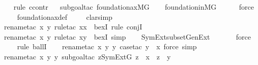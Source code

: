 \begin{isabellebody}
%
\isadelimproof
\ \ %
\endisadelimproof
%
\isatagproof
{}\isamarkupfalse%
{\isacharparenleft}{\kern0pt}rule\ ccontr{\isacharparenright}{\kern0pt}\isanewline
\ \ \isamarkupfalse%
{\isacharparenleft}{\kern0pt}subgoal{\isacharunderscore}{\kern0pt}tac\ {\isachardoublequoteopen}{\isasymnot}foundation{\isacharunderscore}{\kern0pt}ax{\isacharparenleft}{\kern0pt}{\isacharhash}{\kern0pt}{\isacharhash}{\kern0pt}M{\isacharbrackleft}{\kern0pt}G{\isacharbrackright}{\kern0pt}{\isacharparenright}{\kern0pt}{\isachardoublequoteclose}{\isacharparenright}{\kern0pt}\isanewline
\ \ \isamarkupfalse%
\ foundation{\isacharunderscore}{\kern0pt}in{\isacharunderscore}{\kern0pt}MG\ \isanewline
\ \ \ \isamarkupfalse%
\ force\ \isanewline
\ \ \isamarkupfalse%
\ foundation{\isacharunderscore}{\kern0pt}ax{\isacharunderscore}{\kern0pt}def\ \isanewline
\ \ \isamarkupfalse%
\ clarsimp\isanewline
\ \ \isamarkupfalse%
{\isacharparenleft}{\kern0pt}rename{\isacharunderscore}{\kern0pt}tac\ x\ y{\isacharcomma}{\kern0pt}\ rule{\isacharunderscore}{\kern0pt}tac\ x{\isacharequal}{\kern0pt}x\ \ bexI{\isacharcomma}{\kern0pt}\ rule\ conjI{\isacharparenright}{\kern0pt}\isanewline
\ \ \ \ \isamarkupfalse%
{\isacharparenleft}{\kern0pt}rename{\isacharunderscore}{\kern0pt}tac\ x\ y{\isacharcomma}{\kern0pt}\ rule{\isacharunderscore}{\kern0pt}tac\ x{\isacharequal}{\kern0pt}y\ \ bexI{\isacharcomma}{\kern0pt}\ simp{\isacharparenright}{\kern0pt}\isanewline
\ \ \isamarkupfalse%
\ SymExt{\isacharunderscore}{\kern0pt}subset{\isacharunderscore}{\kern0pt}GenExt\ \isanewline
\ \ \ \ \isamarkupfalse%
\ force\ \isanewline
\ \ \ \isamarkupfalse%
{\isacharparenleft}{\kern0pt}rule\ ballI{\isacharparenright}{\kern0pt}\isanewline
\ \ \ \isamarkupfalse%
{\isacharparenleft}{\kern0pt}rename{\isacharunderscore}{\kern0pt}tac\ x\ y\ y{\isacharprime}{\kern0pt}{\isacharcomma}{\kern0pt}\ case{\isacharunderscore}{\kern0pt}tac\ {\isachardoublequoteopen}y{\isacharprime}{\kern0pt}\ {\isasymnotin}\ x{\isachardoublequoteclose}{\isacharcomma}{\kern0pt}\ force{\isacharcomma}{\kern0pt}\ simp{\isacharparenright}{\kern0pt}\isanewline
\ \ \ \isamarkupfalse%
{\isacharparenleft}{\kern0pt}rename{\isacharunderscore}{\kern0pt}tac\ x\ y\ y{\isacharprime}{\kern0pt}{\isacharcomma}{\kern0pt}\ subgoal{\isacharunderscore}{\kern0pt}tac\ {\isachardoublequoteopen}{\isacharparenleft}{\kern0pt}{\isasymexists}z{\isasymin}SymExt{\isacharparenleft}{\kern0pt}G{\isacharparenright}{\kern0pt}{\isachardot}{\kern0pt}\ z\ {\isasymin}\ x\ {\isasymand}\ z\ {\isasymin}\ y{\isacharprime}{\kern0pt}{\isacharparenright}{\kern0pt}{\isachardoublequoteclose}{\isacharparenright}{\kern0pt}\isanewline

\end{isabellebody}
